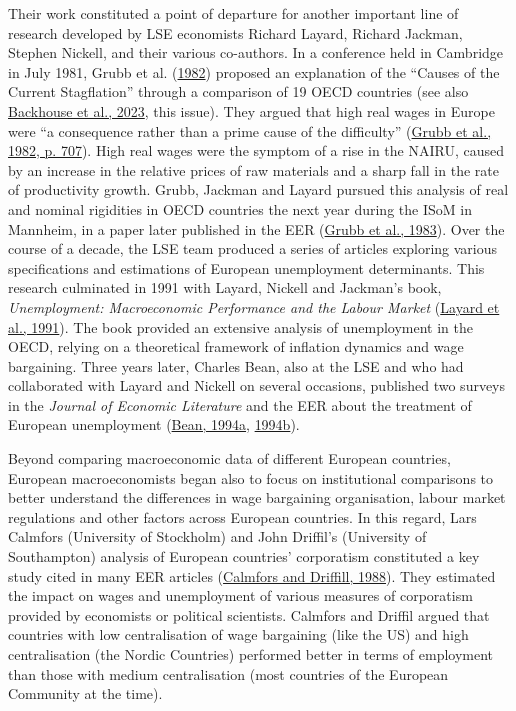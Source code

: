 \documentclass[
  12pt,
  onecolumn]{article}
\begin{document}
Their work constituted a point of departure for another important line of research developed by LSE economists Richard Layard, Richard Jackman, Stephen Nickell, and their various co-authors. In a conference held in Cambridge in July 1981, Grubb et al. (\protect\hyperlink{ref-grubb1982}{1982}) proposed an explanation of the ``Causes of the Current Stagflation'' through a comparison of 19 OECD countries (see also \protect\hyperlink{ref-backhouse2023}{Backhouse et al., 2023}, this issue). They argued that high real wages in Europe were ``a consequence rather than a prime cause of the difficulty'' (\protect\hyperlink{ref-grubb1982}{Grubb et al., 1982, p. 707}). High real wages were the symptom of a rise in the NAIRU, caused by an increase in the relative prices of raw materials and a sharp fall in the rate of productivity growth. Grubb, Jackman and Layard pursued this analysis of real and nominal rigidities in OECD countries the next year during the ISoM in Mannheim, in a paper later published in the EER (\protect\hyperlink{ref-grubb1983a}{Grubb et al., 1983}). Over the course of a decade, the LSE team produced a series of articles exploring various specifications and estimations of European unemployment determinants. This research culminated in 1991 with Layard, Nickell and Jackman's book, \emph{Unemployment: Macroeconomic Performance and the Labour Market} (\protect\hyperlink{ref-layard1991a}{Layard et al., 1991}). The book provided an extensive analysis of unemployment in the OECD, relying on a theoretical framework of inflation dynamics and wage bargaining. Three years later, Charles Bean, also at the LSE and who had collaborated with Layard and Nickell on several occasions, published two surveys in the \emph{Journal of Economic Literature} and the EER about the treatment of European unemployment (\protect\hyperlink{ref-bean1994}{Bean, 1994a}, \protect\hyperlink{ref-bean1994a}{1994b}).

Beyond comparing macroeconomic data of different European countries, European macroeconomists began also to focus on institutional comparisons to better understand the differences in wage bargaining organisation, labour market regulations and other factors across European countries. In this regard, Lars Calmfors (University of Stockholm) and John Driffil's (University of Southampton) analysis of European countries' corporatism constituted a key study cited in many EER articles (\protect\hyperlink{ref-calmfors1988}{Calmfors and Driffill, 1988}). They estimated the impact on wages and unemployment of various measures of corporatism provided by economists or political scientists. Calmfors and Driffil argued that countries with low centralisation of wage bargaining (like the US) and high centralisation (the Nordic Countries) performed better in terms of employment than those with medium centralisation (most countries of the European Community at the time).
\end{document}
